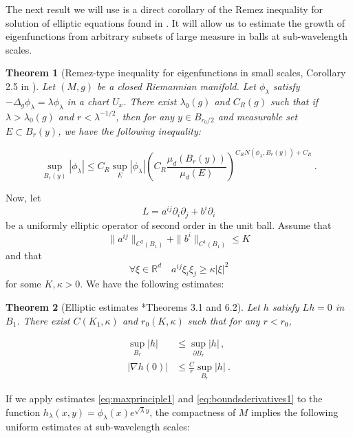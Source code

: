 \documentclass{amsart}
\newcommand{\Rb}{\mathbb{R}}
\newtheorem{theorem}{Theorem}[section]
\begin{document}
The next result we will use is a direct corollary of the Remez inequality for solution of elliptic equations found in \cite{logu-mali-icm}. It will allow us to estimate the growth of eigenfunctions from arbitrary subsets of large measure in balls at sub-wavelength scales.

\begin{theorem}[Remez-type inequality for eigenfunctions in small scales, Corollary 2.5 in \cite{cha-man}]\label{cor:remez-eigen}
Let $(M, g)$ be a closed Riemannian manifold. Let $\phi_\lambda$ satisfy $-\Delta_g \phi_\lambda = \lambda \phi_\lambda$ in a chart $U_x$. There exist $\lambda_0(g)$ and $C_R(g)$ such that if $\lambda > \lambda_0(g)$ and $r<\lambda^{-1/2}$, then for any $y \in B_{r_0/2}$ and measurable set $E \subset B_r(y)$, we have the following inequality:

 \begin{equation}\label{eq:remez}
 \sup_{B_r(y)} |\phi_\lambda|\leq C_R\sup_E |\phi_\lambda| \left(C_R\frac{\mu_d(B_r(y))}{\mu_d(E)}\right)^{C_R N\left(\phi_\lambda, B_r(y)\right)+C_R}\ .
 \end{equation}

 \end{theorem}

Now, let 
$$L = a^{ij}\partial_i\partial_j+b^i\partial_i $$
be a uniformly elliptic operator of second order in the  unit ball.
Assume that 
$$\|a^{ij}\|_{C^2(B_1)}+\|b^i\|_{C^1(B_1)}\leq K$$
and that 
$$\forall \xi\in\Rb^d\quad a^{ij}\xi_i\xi_j \geq \kappa |\xi|^2$$
for some $K,\kappa>0$. We have the following estimates:
\begin{theorem}[Elliptic estimates {\cite{gil-tru}*{Theorems 3.1 and 6.2}}]
\label{thm:gradient}
Let $h$ satisfy $Lh=0$ in $B_1$. There exist  $C(K_1,\kappa)$ and $r_0(K,\kappa)$ such that for any $r < r_0$,  


\begin{align}
    \sup\limits_{B_r} |h| &\leq \sup\limits_{\partial B_r} |h| \, ,\label{eq:maxprinciple1} \\
    |\nabla h(0)| &\leq \frac{C}{r}\sup_{B_r} |h|\ . \label{eq:boundsderivatives1}
\end{align}


\end{theorem}

If we apply estimates \eqref{eq:maxprinciple1} and \eqref{eq:boundsderivatives1} to the function $h_\lambda(x,y) = \phi_\lambda(x)e^{\sqrt{\lambda}y}$, the compactness of $M$ implies the following uniform estimates at sub-wavelength scales:
\end{document}
